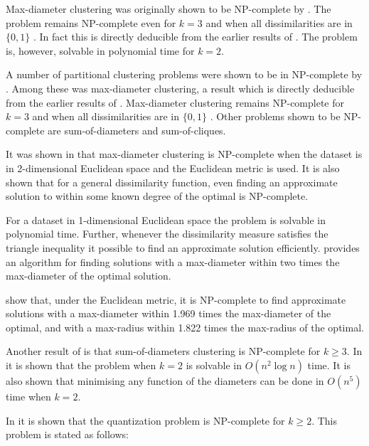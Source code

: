 \documentclass[a4paper]{report}
\begin{document}
Max-diameter clustering was originally shown to be NP-complete by
\citet{brucker1978complexity}.  The problem remains NP-complete even for $k=3$
and when all dissimilarities are in $\{0,1\}$ \citep{gareyjohnson79}.  In fact
this is directly deducible from the earlier results of \citet{sahni1976p}.
The problem is, however, solvable in polynomial time for $k=2$.

A number of partitional clustering problems were shown to be in NP-complete by
\citet{brucker1978complexity}.  Among these was max-diameter clustering, a
result which is directly deducible from the earlier results of
\citet{sahni1976p}.  Max-diameter clustering remains NP-complete for $k=3$ and
when all dissimilarities are in $\{0,1\}$ \citep{gareyjohnson79}.  Other
problems shown to be NP-complete are sum-of-diameters and sum-of-cliques.

It was shown in \citet{gonzalez1985clustering} that max-diameter clustering is
NP-complete when the dataset is in 2-dimensional Euclidean space and the
Euclidean metric is used.  It is also shown that for a general dissimilarity
function, even finding an approximate solution to within some known degree of
the optimal is NP-complete.

For a dataset in 1-dimensional Euclidean space the problem is solvable in
polynomial time.  Further, whenever the dissimilarity measure satisfies the
triangle inequality it possible to find an approximate solution efficiently.
\citet{brucker1978complexity} provides an algorithm for finding solutions with
a max-diameter within two times the max-diameter of the optimal solution.

\citet{bern1996approximation} show that, under the Euclidean metric, it is
NP-complete to find approximate solutions with a max-diameter within 1.969
times the max-diameter of the optimal, and with a max-radius within 1.822
times the max-radius of the optimal.

Another result of \citet{brucker1978complexity} is that sum-of-diameters
clustering is NP-complete for $k \geq 3$.  In \citet{hansen87sumofdiameters}
it is shown that the problem when $k=2$ is solvable in $O(n^2 \log n)$ time.
It is also shown that minimising any function of the diameters can be done in
$O(n^5)$ time when $k=2$.

In \citet{garey82quant} it is shown that the quantization problem is
NP-complete for $k \geq 2$.  This problem is stated as follows:
\end{document}
